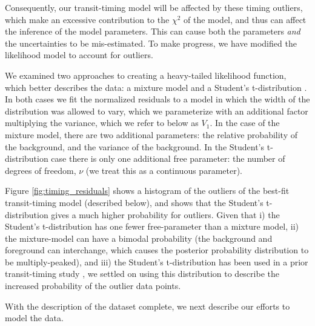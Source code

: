 \documentclass[fleqn,usenatbib]{mnras} %
\begin{document}
Consequently, our transit-timing model will be affected by these
timing outliers, which make an excessive contribution to the
$\chi^2$ of the model, and thus can affect the inference of
the model parameters.   This can cause both the parameters {\it and}
the uncertainties to be mis-estimated.  To make progress, we have
modified the likelihood model to account for outliers.

We examined two approaches to creating a heavy-tailed likelihood function, which
better describes the data:  a mixture model \citep{Hogg2010,ForemanMackey2014} and
a Student's t-distribution \citep{JontofHutter2016}.   In both cases
we fit the normalized residuals to a model
in which the width of the distribution was
allowed to vary, which we parameterize with
an additional factor multiplying the variance, which we refer to below as $V_1$.  In the case of the mixture
model, there are two additional parameters:
the relative probability of the background, and
the variance of the background.  In the Student's t-distribution case there is only one 
additional free parameter:  the number of
degrees of freedom, $\nu$ (we treat this as a continuous parameter).

Figure \ref{fig:timing_residuals} shows a histogram of the outliers of the best-fit transit-timing model (described below), 
and shows that %
the Student's t-distribution gives a much higher probability
for outliers. %
Given that
i) the Student's t-distribution has one fewer free-parameter than a mixture model, ii)  the 
mixture-model can have a  bimodal probability (the background and foreground can interchange, 
which causes the posterior probability distribution to be multiply-peaked),
and iii)  the Student's t-distribution has been used in a prior transit-timing study \citep{JontofHutter2016},
we settled on using this distribution to describe the increased probability
of the outlier data points. 

With the description of the dataset complete, we next describe our efforts to model the data.



\end{document}
